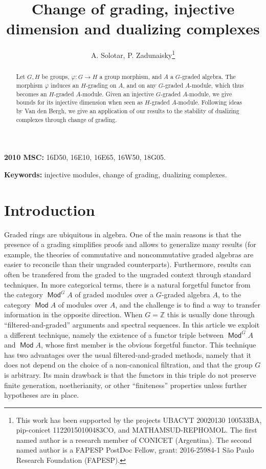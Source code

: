 \documentclass[11pt,fleqn]{article}
\title{
Change of grading, injective dimension and dualizing complexes
}
\author{A. Solotar,
P. Zadunaisky\footnote{This work has been supported by the projects 
UBACYT 20020130 100533BA, pip-conicet 11220150100483CO, and 
MATHAMSUD-REPHOMOL. The first named author is a research member of CONICET 
(Argentina). The second named author is a FAPESP PostDoc Fellow, grant: 
2016-25984-1 S\~ao Paulo Research Foundation (FAPESP).}
}
\date{}
\newcommand\ZZ{\mathbb Z}
\renewcommand\to{\longrightarrow}
\renewcommand\phi{\varphi}
\DeclareMathOperator\Mod{\mathsf{Mod}}
\begin{document}
\maketitle

\begin{abstract}
Let $G,H$ be groups, $\phi: G \to H$ a group morphism, and $A$ a $G$-graded 
algebra. The morphism $\phi$ induces an $H$-grading on $A$, and on any 
$G$-graded $A$-module, which thus becomes an $H$-graded $A$-module.
Given an injective $G$-graded $A$-module, we give bounds for its injective
dimension when seen as $H$-graded $A$-module. Following ideas by Van den
Bergh, we give an application of our results to the stability of dualizing
complexes through change of grading.
\end{abstract}

\textbf{2010 MSC:} 16D50, 16E10, 16E65, 16W50, 18G05.

\textbf{Keywords:} injective modules, change of grading, dualizing complexes.

\section{Introduction}
Graded rings are ubiquitous in algebra. One of the main reasons is that the
presence of a grading simplifies proofs and allows to generalize many results
(for example, the theories of commutative and noncommutative graded algebras are 
easier to reconcile than their ungraded counterparts). Furthermore, results can 
often be transfered from the graded to the ungraded context through standard 
techniques. In more categorical terms, there is a natural forgetful functor 
from the category $\Mod^G A$ of graded modules over a $G$-graded algebra 
$A$, to the category $\Mod A$ of modules over $A$, and the challenge is to 
find a way to transfer information in the opposite direction. When $G = \ZZ$ 
this is usually done through ``filtered-and-graded'' arguments and spectral 
sequences. In this article we exploit a different technique, 
namely the existence of a functor triple between $\Mod^G A$ and $\Mod A$, 
whose first member is the obvious forgetful functor. This technique has two 
advantages over the usual filtered-and-graded methods, namely that it does not 
depend on the choice of a non-canonical filtration, and that the group $G$ is
arbitrary. Its main drawback is that the functors in this triple do not 
preserve finite generation, noetherianity, or other ``finiteness'' properties
unless further hypotheses are in place.
\end{document}

